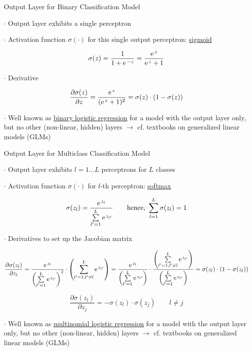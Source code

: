 \documentclass[mathserif, aspectratio=1610]{intbeamer}
\begin{document}
\begin{frame}[t]{Output Layer for Binary Classification Model}

$\cdot$ Output layer exhibits a single perceptron

$\cdot$ Activation function $\sigma(\cdot)$ for this single output perceptron: \underline{sigmoid}

$$\sigma(z) = \frac{1}{1+\e^{-z}} = \frac{\e^{z}}{\e^{z}+1}$$

\begin{center}
\end{center}

$\cdot$ Derivative

$$\frac{\partial \sigma(z)}{\partial z} = \frac{\e^{z}}{(\e^{z}+1)^2} = \sigma(z) \cdot (1-\sigma(z))$$

$\cdot$ Well known as \underline{binary logistic regression} for a model with the output layer only, but no other (non-linear, hidden) layers $\rightarrow$ cf. textbooks on generalized linear models (GLMs)

\end{frame}



\begin{frame}[t]{Output Layer for Multiclass Classification Model}

$\cdot$ Output layer exhibits $l=1 \dots L$ perceptrons for $L$ classes

$\cdot$ Activation function $\sigma(\cdot)$ for $l\text{-th}$ perceptron: \underline{softmax}

$$\sigma(z_l) = \frac{\e^{z_l}}{\sum\limits_{l'=1}^{L} \e^{z_{l'}}} \qquad \text{hence, }\sum\limits_{l=1}^{L} \sigma(z_l) = 1$$

$\cdot$ Derivatives to set up the Jacobian matrix

$$\frac{\partial \sigma(z_l)}{\partial z_l} = \frac{\e^{z_l}}{\left(\sum\limits_{l'=1}^{L} \e^{z_{l'}}\right)^2} \cdot \left(\sum\limits_{l'=1, l' \neq l}^{L} \e^{z_{l'}}\right)=
\frac{\e^{z_l}}{\left(\sum\limits_{l'=1}^{L} \e^{z_{l'}}\right)} \cdot
\frac{\left(\sum\limits_{l'=1, l' \neq l}^{L} \e^{z_{l'}}\right)}{\left(\sum\limits_{l'=1}^{L} \e^{z_{l'}}\right)}=
\sigma(z_l) \cdot(1-\sigma(z_l))
$$

$$\frac{\partial \sigma(z_l)}{\partial z_j} = - \sigma(z_l) \cdot \sigma(z_j)\qquad l \neq j$$

$\cdot$ Well known as \underline{multinomial logistic regression} for a model with the output layer only, but no other (non-linear, hidden) layers $\rightarrow$ cf. textbooks on generalized linear models (GLMs)


\end{frame}
\end{document}
